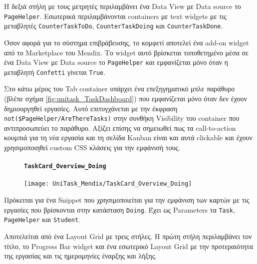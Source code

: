                 Η δεξιά στήλη με τους μετρητές περιλαμβάνει ένα Data View με Data source το \texttt{PageHelper}. Εσωτερικά περιλαμβάνονται containers με text widgets με τις μεταβλητές \texttt{CounterTaskToDo}, \texttt{CounterTaskDoing} και \texttt{CounterTaskDone}.

                Όσον αφορά για το σύστημα επιβράβευσης, το κομφετί αποτελεί ένα add-on widget από το Marketplace του Mendix. Το widget αυτό βρίσκεται τοποθετημένο μέσα σε ένα Data View με Data source το \texttt{PageHelper} και εμφανίζεται μόνο όταν η μεταβλητή \texttt{Confetti} γίνεται \texttt{True}.

                Στο κάτω μέρος του Tab container υπάρχει ένα επεξηγηματικό μπλε παράθυρο (βλέπε σχήμα \ref{fig:unitask_TaskDashboard}) που εμφανίζεται μόνο όταν δεν έχουν δημιουργηθεί εργασίες. Αυτό επιτυγχάνεται με την έκφραση \verb|not($PageHelper/AreThereTasks)| στην συνθήκη Visibility του container που αντιπροσωπεύει το παράθυρο. Αξίζει επίσης να σημειωθεί πως τα call-to-action κουμπιά για τη νέα εργασία και τη σελίδα Kanban είναι και αυτά clickable και έχουν χρησιμοποιηθεί custom CSS κλάσεις για την εμφάνισή τους.

                \begin{figure}[H] \noindent
                    \paragraph{\texttt{TaskCard\_Overview\_Doing}}
                    \begin{center}
                        \texttt{[image: UniTask\_Mendix/TaskCard\_Overview\_Doing]}
                    \end{center}
                \end{figure}

                Πρόκειται για ένα Snippet που χρησιμοποιείται για την εμφάνιση των καρτών με τις εργασίες που βρίσκονται στην κατάσταση \texttt{Doing}. Έχει ως Parameters τα \texttt{Task}, \texttt{PageHelper} και \texttt{Student}.

                Αποτελείται από ένα Layout Grid με τρεις στήλες. Η πρώτη στήλη περιλαμβάνει τον τίτλο, το Progress Bar widget και ένα εσωτερικό Layout Grid με την προτεραιότητα της εργασίας και τις ημερομηνίες έναρξης και λήξης.

